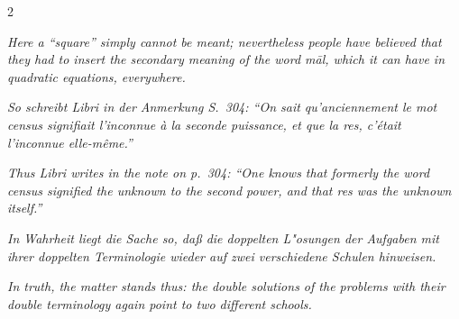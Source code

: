 \documentclass[10pt,a4paper]{article}
\newcommand{\enquote}[1]{``#1''}
\begin{document}
\begin{paracol}{2}
\switchcolumn

\textit{Here a \enquote{square} simply cannot be meant; nevertheless people have believed that they had to insert the secondary meaning of the word \textit{m\=al}, which it can have in quadratic equations, everywhere.}

\switchcolumn*

\textit{So schreibt Libri in der Anmerkung S.\ 304: \enquote{On sait qu'anciennement le mot census signifiait l'inconnue \`a la seconde puissance, et que la res, c'\'etait l'inconnue elle-m\^eme.}}

\switchcolumn

\textit{Thus Libri writes in the note on p.\ 304: \enquote{One knows that formerly the word census signified the unknown to the second power, and that res was the unknown itself.}}

\switchcolumn*

\textit{In Wahrheit liegt die Sache so, da\ss{} die doppelten L"osungen der Aufgaben mit ihrer doppelten Terminologie wieder auf zwei verschiedene Schulen hinweisen.}

\switchcolumn

\textit{In truth, the matter stands thus: the double solutions of the problems with their double terminology again point to two different schools.}

\end{paracol}

\clearpage
\end{document}
